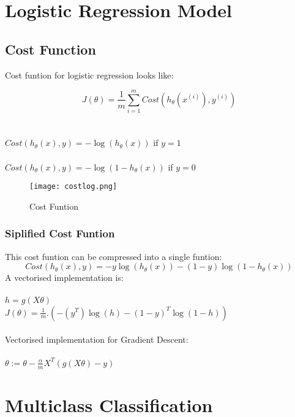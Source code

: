 \section{Logistic Regression Model}

  \subsection{Cost Function}
    Cost funtion for logistic regression looks like:

    \begin{equation}
      J(\theta) = \frac{1}{m}\sum_{i=1}^{m}Cost(h_\theta(x^{(i)}), y^{(i)})
    \end{equation}
    \\ \\
    $ Cost(h_\theta(x),y) = -\log{(h_\theta{(x)})} $ \hfill if $y = 1$
    \\ \\
    $Cost(h_\theta(x),y) = -\log{(1-h_\theta{(x)})}$  \hfill if $y = 0$

    \begin{figure}[h]
      \centering
      \texttt{[image: costlog.png]}
      \caption{Cost Funtion}
    \end{figure}

    \subsubsection{Siplified Cost Funtion}
    This cost funtion can be compressed into a single funtion:
    \begin{equation}
      Cost(h_\theta(x),y) = -y\log{(h_\theta{(x)})} -(1-y)\log{(1-h_\theta{(x)})}
    \end{equation}
    A vectorised implementation is: \\ \\
    $h = g(X\theta)$\\
    $J(\theta) = \frac{1}{m}.(-(y^T)\log{(h)}-(1-y)^T\log{(1-h)})$
    \\ \\
    Vectorised implementation for Gradient Descent: \\ \\
    $\theta := \theta - \frac{\alpha}{m}X^T(g(X\theta)-y)$

\section{Multiclass Classification}
